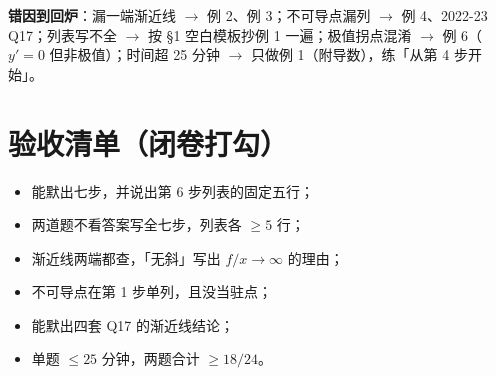 \documentclass[11pt,a4paper]{ctexart}
\begin{document}
\noindent\textbf{错因到回炉}：漏一端渐近线 $\to$ 例 2、例 3；不可导点漏列 $\to$ 例 4、2022-23 Q17；列表写不全 $\to$ 按 \S 1 空白模板抄例 1 一遍；极值拐点混淆 $\to$ 例 6（$y'=0$ 但非极值）；时间超 25 分钟 $\to$ 只做例 1（附导数），练「从第 4 步开始」。

\section{验收清单（闭卷打勾）}

\begin{itemize}[label=$\square$,leftmargin=2em]
\item 能默出七步，并说出第 6 步列表的固定五行；
\item 两道题不看答案写全七步，列表各 $\ge 5$ 行；
\item 渐近线两端都查，「无斜」写出 $f/x\to\infty$ 的理由；
\item 不可导点在第 1 步单列，且没当驻点；
\item 能默出四套 Q17 的渐近线结论；
\item 单题 $\le 25$ 分钟，两题合计 $\ge 18/24$。
\end{itemize}

\vspace{0.6em}
\end{document}
